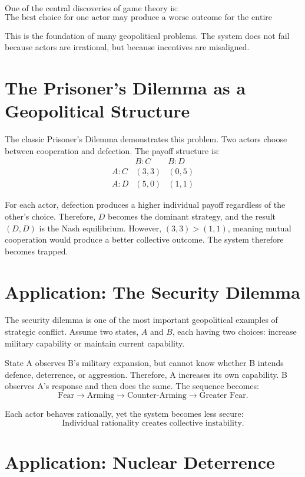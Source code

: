 \documentclass[11pt,openany]{book}
\theoremstyle{plain}
\theoremstyle{definition}
\begin{document}
One of the central discoveries of game theory is:
\[
\boxed{
\text{The best choice for one actor may produce a worse outcome for the entire system.}
}
\]

This is the foundation of many geopolitical problems. The system does not fail because actors are irrational, but because incentives are misaligned.

\section*{The Prisoner's Dilemma as a Geopolitical Structure}

The classic Prisoner's Dilemma demonstrates this problem. Two actors choose between cooperation and defection. The payoff structure is:
\[
\begin{array}{c|c|c}
& B: C & B: D \\
\hline
A: C & (3, 3) & (0, 5) \\
A: D & (5, 0) & (1, 1)
\end{array}
\]

For each actor, defection produces a higher individual payoff regardless of the other's choice. Therefore, \(D\) becomes the dominant strategy, and the result \((D, D)\) is the Nash equilibrium. However, \((3, 3) > (1, 1)\), meaning mutual cooperation would produce a better collective outcome. The system therefore becomes trapped.

\section*{Application: The Security Dilemma}

The security dilemma is one of the most important geopolitical examples of strategic conflict. Assume two states, \(A\) and \(B\), each having two choices: increase military capability or maintain current capability. 

State A observes B's military expansion, but cannot know whether B intends defence, deterrence, or aggression. Therefore, A increases its own capability. B observes A's response and then does the same. The sequence becomes:
\[
\text{Fear}
\longrightarrow
\text{Arming}
\longrightarrow
\text{Counter-Arming}
\longrightarrow
\text{Greater Fear}.
\]

Each actor behaves rationally, yet the system becomes less secure:
\[
\boxed{
\text{Individual rationality creates collective instability.}
}
\]

\section*{Application: Nuclear Deterrence}
\end{document}
